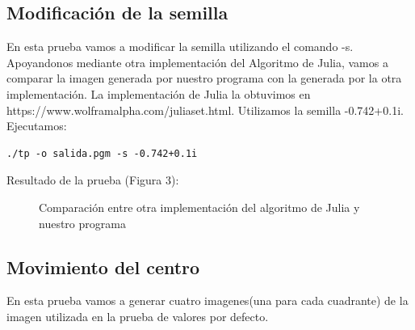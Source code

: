 \documentclass [12pt, a4paper]{article}
\begin{document}
	\subsection{Modificación de la semilla}
	En esta prueba vamos a modificar la semilla utilizando el comando -s. Apoyandonos mediante otra implementación del Algoritmo de Julia, vamos a comparar la imagen generada por nuestro programa con la generada por la otra implementación. La implementación de Julia la obtuvimos en https://www.wolframalpha.com/juliaset.html. Utilizamos la semilla  -0.742+0.1i.
	\\
	Ejecutamos: 
	\begin{lstlisting}[stepnumber=0,frame=simple]
./tp -o salida.pgm -s -0.742+0.1i
	\end{lstlisting}\vspace{5mm}
	Resultado de la prueba (Figura 3):
		\begin{figure}[h]
		\centering
		\caption{Comparación entre otra implementación del algoritmo de Julia y nuestro programa}
		\label{f:comparacion3}
	\end{figure}

	\subsection{Movimiento del centro}
	En esta prueba vamos a generar cuatro imagenes(una para cada cuadrante) de la imagen utilizada en la prueba de valores por defecto.\\
	
\end{document}
